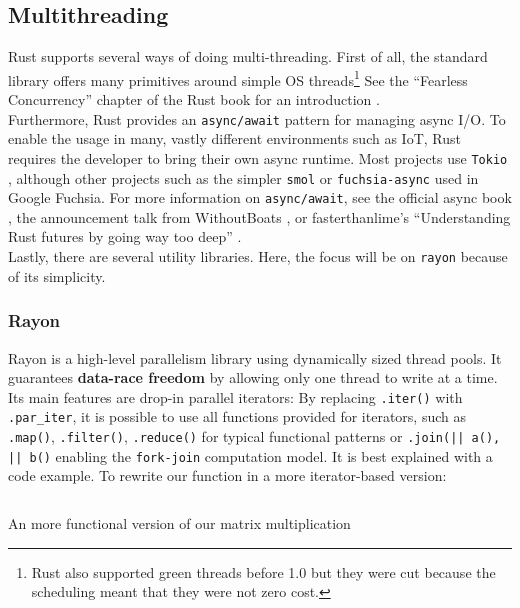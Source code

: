 \subsection{Multithreading}

Rust supports several ways of doing multi-threading. First of all, the standard library offers many primitives around simple OS threads\footnote{Rust also supported green threads before 1.0 but they were cut because the scheduling meant that they were not zero cost.} See the ``Fearless Concurrency'' chapter of the Rust book for an introduction \cite{conbook}.\\

Furthermore, Rust provides an \texttt{async/await} pattern for managing async \ac{I/O}. To enable the usage in many, vastly different environments such as \ac{IoT}, Rust requires the developer to bring their own async runtime. Most projects use \texttt{Tokio} \cite{tokio}, although other projects such as the simpler \texttt{smol} or \texttt{fuchsia-async} \cite{fuchsia} used in Google Fuchsia. For more information on \texttt{async/await}, see the official async book \cite{asyncbook}, the announcement talk from WithoutBoats \cite{withoutboats}, or fasterthanlime's ``Understanding Rust futures by going way too deep'' \cite{fasterthanlime}.\\

Lastly, there are several utility libraries. Here, the focus will be on \texttt{rayon} because of its simplicity.

\subsubsection{Rayon}

Rayon is a high-level parallelism library using dynamically sized thread pools. It guarantees \textbf{data-race freedom} by allowing only one thread to write at a time. Its main features are drop-in parallel iterators: By replacing \texttt{.iter()} with \texttt{.par\_iter}, it is possible to use all functions provided for iterators, such as \texttt{.map()}, \texttt{.filter()}, \texttt{.reduce()} for typical functional patterns or \texttt{.join(|| a(), || b()} enabling the \texttt{fork-join} computation model.
It is best explained with a code example. To rewrite our function in a more iterator-based version:

\begin{listing}[H]
  \inputminted{rust}{./assets/02rayon.rs}
\caption{An more functional version of our matrix multiplication}
\end{listing}

